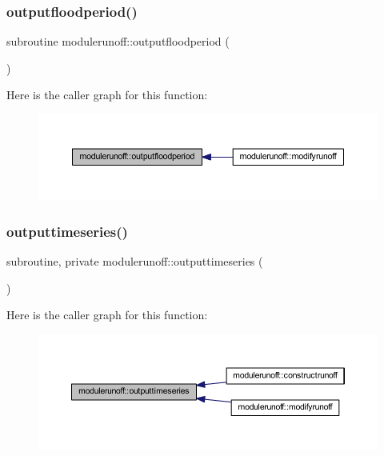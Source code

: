 \subsubsection{\texorpdfstring{outputfloodperiod()}{outputfloodperiod()}}
{\footnotesize\ttfamily subroutine modulerunoff\+::outputfloodperiod (\begin{DoxyParamCaption}{ }\end{DoxyParamCaption})\hspace{0.3cm}{\ttfamily [private]}}

Here is the caller graph for this function\+:
\nopagebreak
\begin{figure}[H]
\begin{center}
\leavevmode
\includegraphics[width=350pt]{namespacemodulerunoff_ad52912e124d2d30970fdc6d5bd8c15cc_icgraph}
\end{center}
\end{figure}
\mbox{\label{namespacemodulerunoff_aaf5ac22ae6531f74c06c4596a878eaf9}} 
\subsubsection{\texorpdfstring{outputtimeseries()}{outputtimeseries()}}
{\footnotesize\ttfamily subroutine, private modulerunoff\+::outputtimeseries (\begin{DoxyParamCaption}{ }\end{DoxyParamCaption})\hspace{0.3cm}{\ttfamily [private]}}

Here is the caller graph for this function\+:
\nopagebreak
\begin{figure}[H]
\begin{center}
\leavevmode
\includegraphics[width=350pt]{namespacemodulerunoff_aaf5ac22ae6531f74c06c4596a878eaf9_icgraph}
\end{center}
\end{figure}
\mbox{\label{namespacemodulerunoff_a5181922fc72d5c17acb9fdf3127d6318}} 
